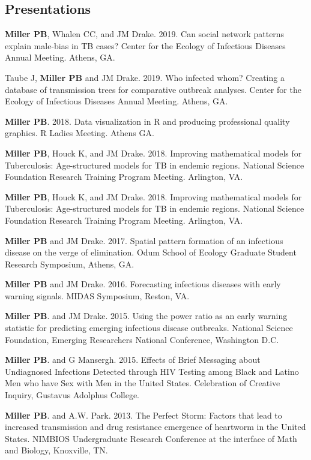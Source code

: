 \documentclass[letterpaper]{article}
\renewenvironment{itemize}{
  \begin{list}{}{
    \setlength{\leftmargin}{1.5em}
  }
}{
  \end{list}
}
\begin{document}
\subsection*{Presentations}
\begin{itemize}
\item \textbf{Miller PB}, Whalen CC, and JM Drake. 2019. Can social network patterns explain male-bias in TB cases? Center for the Ecology of Infectious Diseases Annual Meeting. Athens, GA.
\item Taube J, \textbf{Miller PB} and JM Drake. 2019. Who infected whom? Creating a database of transmission trees for comparative outbreak analyses. Center for the Ecology of Infectious Diseases Annual Meeting. Athens, GA.
\item \textbf{Miller PB}. 2018. Data visualization in R and producing professional quality graphics. R Ladies Meeting. Athens GA. 
\item \textbf{Miller PB}, Houck K, and JM Drake. 2018. Improving mathematical models for Tuberculosis: Age-structured models for TB in endemic regions. National Science Foundation Research Training Program Meeting. Arlington, VA. 
\item \textbf{Miller PB}, Houck K, and JM Drake. 2018. Improving mathematical models for Tuberculosis: Age-structured models for TB in endemic regions. National Science Foundation Research Training Program Meeting. Arlington, VA. 
\item \textbf{Miller PB} and JM Drake. 2017. Spatial pattern formation of an infectious disease on the verge of elimination. Odum School of Ecology Graduate Student Research Symposium, Athens, GA. 
\item \textbf{Miller PB} and JM Drake. 2016. Forecasting infectious diseases with early warning signals. MIDAS Symposium, Reston, VA. 
\item \textbf{Miller PB}. and JM Drake. 2015. Using the power ratio as an early warning statistic for predicting emerging infectious disease outbreaks. National Science Foundation, Emerging Researchers National Conference, Washington D.C.
\item \textbf{Miller PB}. and G Mansergh. 2015. Effects of Brief Messaging about Undiagnosed Infections Detected through HIV Testing among Black and Latino Men who have Sex with Men in the United States. Celebration of Creative Inquiry, Gustavus Adolphus College.
\item \textbf{Miller PB}. and A.W. Park. 2013. The Perfect Storm: Factors that lead to increased transmission and drug resistance emergence of heartworm in the United States. NIMBIOS Undergraduate Research Conference at the interface of Math and Biology, Knoxville, TN.
\end{itemize}
\end{document}
